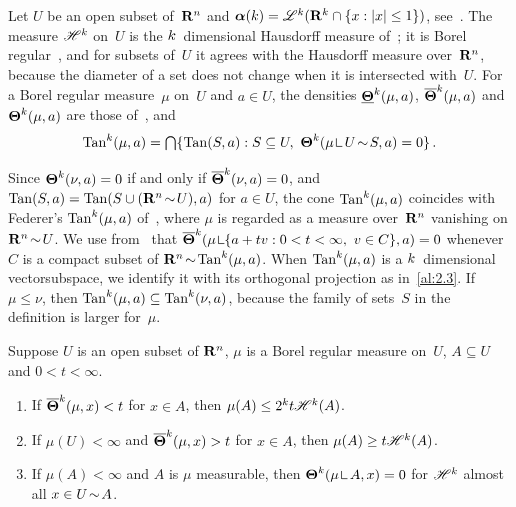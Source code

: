 \begin{definition}
    \label{al:2.8(1)}
    Let $U$ be an open subset of~$\mathbf{R}^{n}$ and $\boldsymbol{\alpha}(k) = \mathscr{L}^{k}(\mathbf{R}^{k}
    \cap \{ x : |x| \le 1 \})$, see~\cite[2.7.16(1)]{Federer1969}. The measure $\mathscr{H}^{k}$ on~$U$
    is the $k$~dimensional Hausdorff measure of~\cite[2.10.2(1)]{Federer1969}; it is Borel
    regular~\cite[2.10.2(1)]{Federer1969}, and for subsets of~$U$ it agrees with the Hausdorff
    measure over~$\mathbf{R}^{n}$, because the diameter of a set does not change when it is
    intersected with~$U$. For a Borel regular measure~$\mu$ on~$U$ and $a \in U$, the densities
    $\boldsymbol{\underline{\Theta}}^{k}(\mu,a)$, $\boldsymbol{\overline{\Theta}}^{k}(\mu,a)$ and $\boldsymbol{\Theta}^{k}(\mu,a)$ are those
    of~\cite[2.10.19]{Federer1969}, and
    \begin{displaymath}
        \Tan^{\vdim}(\mu,a) = \tbcap \{ \Tan(S,a) : S \subseteq U,\ \density^{\vdim}(\mu
        \restrict U \without S, a) = 0 \} \,.
    \end{displaymath}
\end{definition}

\begin{remark}
    \label{rem:2.8(3)}
    Since $\boldsymbol{\Theta}^{k}(\nu,a) = 0$ if and only if $\boldsymbol{\overline{\Theta}}^{k}(\nu,a) = 0$, and $\operatorname{Tan}(S,a)
    = \operatorname{Tan}(S \cup (\mathbf{R}^{n} \!\sim\! U), a)$ for $a \in U$, the cone $\operatorname{Tan}^{k}(\mu,a)$
    coincides with Federer's $\operatorname{Tan}^{k}(\mu,a)$ of~\cite[3.2.16]{Federer1969}, where $\mu$ is
    regarded as a measure over~$\mathbf{R}^{n}$ vanishing on $\mathbf{R}^{n} \!\sim\! U$. We use
    from~\cite[3.2.16]{Federer1969} that $\udensity^{\vdim}(\mu \restrict \{ a + t v : 0 < t <
    \infty,\ v \in C \}, a) = 0$ whenever $C$ is a compact subset of $\mathbf{R}^{n} \!\sim\!
    \operatorname{Tan}^{k}(\mu,a)$. When $\operatorname{Tan}^{k}(\mu,a)$ is a $k$~dimensional vectorsubspace, we
    identify it with its orthogonal projection as in~\ref{al:2.3}. If $\mu \le \nu$, then
    $\operatorname{Tan}^{k}(\mu,a) \subseteq \operatorname{Tan}^{k}(\nu,a)$, because the family of sets~$S$ in the
    definition is larger for~$\mu$.
\end{remark}

\begin{lemma}
    \label{al:2.8(2)}
    Suppose $U$ is an open subset of $\mathbf{R}^{n}$, $\mu$ is a Borel regular measure on~$U$, $A
    \subseteq U$ and $0 < t < \infty$.
    \begin{enumerate}
        \item If $\boldsymbol{\overline{\Theta}}^{k}(\mu,x) < t$ for $x \in A$, then $\mu(A) \le 2^{k} t
            \mathscr{H}^{k}(A)$.
        \item If $\mu(U) < \infty$ and $\boldsymbol{\overline{\Theta}}^{k}(\mu,x) > t$ for $x \in A$, then
            $\mu(A) \ge t \mathscr{H}^{k}(A)$.
        \item If $\mu(A) < \infty$ and $A$ is $\mu$ measurable, then $\density^{\vdim}(\mu
            \restrict A, x) = 0$ for $\mathscr{H}^{k}$ almost all $x \in U \!\sim\! A$.
    \end{enumerate}
\end{lemma}

